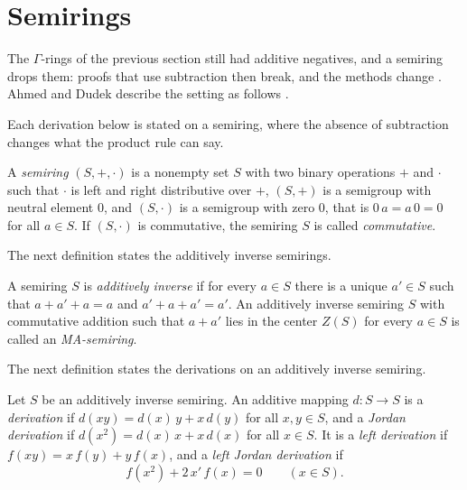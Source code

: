 \section{Semirings}\label{sec:other-systems:semirings}

The $\Gamma$-rings of the previous section still had additive negatives,
and a semiring drops them: proofs that use subtraction then break, and
the methods change \cite[p.~624]{AhmedDudek2021}. Ahmed and Dudek
describe the setting as follows
\cite[p.~625]{AhmedDudek2021}.

Each derivation below is stated on a semiring, where the absence of
subtraction changes what the product rule can say. %

\begin{definition}\label{def:other:semiring}
A \emph{semiring} $(S, +, \cdot)$ is a nonempty set $S$ with two binary
operations $+$ and $\cdot$ such that $\cdot$ is left and right
distributive over $+$, $(S, +)$ is a semigroup with neutral element $0$,
and $(S, \cdot)$ is a semigroup with zero $0$, that is $0\,a = a\,0 = 0$
for all $a \in S$. If $(S, \cdot)$ is commutative, the semiring $S$ is
called \emph{commutative}.
\end{definition}

The next definition states the additively inverse semirings.

\begin{definition}\label{def:other:ma-semiring}
A semiring $S$ is \emph{additively inverse} if for every $a \in S$ there
is a unique $a' \in S$ such that $a + a' + a = a$ and $a' + a + a' = a'$.
An additively inverse semiring $S$ with commutative addition such that
$a + a'$ lies in the center $Z(S)$ for every $a \in S$ is called an
\emph{MA-semiring}.
\end{definition}

The next definition states the derivations on an additively inverse semiring.

\begin{definition}\label{def:other:semiring-derivations}
Let $S$ be an additively inverse semiring. An additive mapping
$d \colon S \to S$ is a \emph{derivation} if
$d(xy) = d(x)\,y + x\,d(y)$ for all $x, y \in S$, and a \emph{Jordan
derivation} if $d(x^{2}) = d(x)\,x + x\,d(x)$ for all $x \in S$. It is a
\emph{left derivation} if $f(xy) = x\,f(y) + y\,f(x)$, and a \emph{left
Jordan derivation} if
\[
f(x^{2}) + 2\,x'\,f(x) = 0 \qquad (x \in S).
\]
\end{definition}

